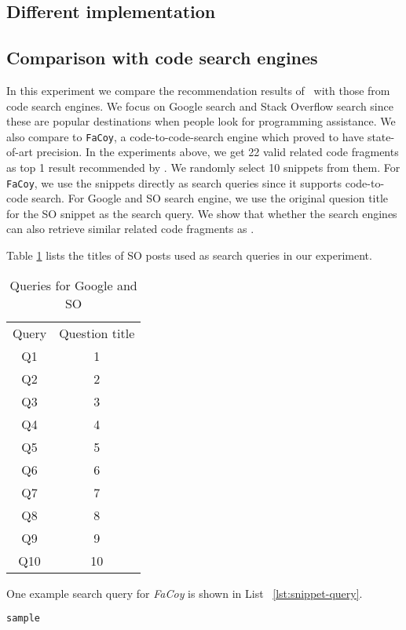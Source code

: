 \subsection{Different implementation} 



\subsection{Comparison with code search engines}
In this experiment we compare the recommendation results of \tool\ with those from code search engines. We focus on Google search and Stack Overflow search since these are popular destinations when people look for programming assistance. We also compare to \texttt{FaCoy}, a code-to-code-search engine which proved to have state-of-art precision. In the experiments above, we get 22 valid related code fragments as top 1 result recommended by \tool. We randomly select 10 snippets from them. For \texttt{FaCoy}, we use the snippets directly as search queries since it supports code-to-code search. For Google and SO search engine, we use the original quesion title for the SO snippet as the search query. We show that whether the search engines can also retrieve similar related code fragments as \tool. 

Table \ref{tab:so-questions} lists the titles of SO posts used as search queries in our experiment.

\begin{table}
	\begin{center}
		\begin{tabular}{ c|c } 
			Query & Question title \\ 
			Q1 &  1\\\hline 
			Q2 &  2 \\ \hline
			Q3 &  3 \\ \hline
			Q4 &  4 \\ \hline
			Q5 &  5 \\ \hline
			Q6 &  6 \\ \hline
			Q7 &  7	\\ \hline
			Q8 &  8	\\ \hline
			Q9 &  9	\\ \hline
			Q10 & 10\\ \hline
		\end{tabular}		
	\end{center}
	\caption{Queries for Google and SO}
	\label{tab:so-questions}
\end{table}

One example search query for \textit{FaCoy} is shown in List ~\ref{lst:snippet-query}.
\begin{lstlisting}[label={lst:snippet-query}]
	sample
\end{lstlisting}

